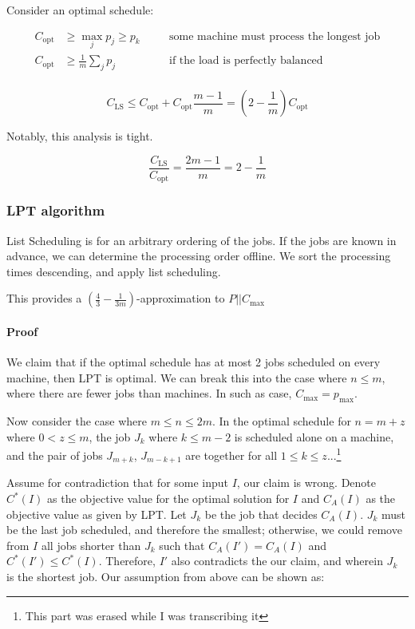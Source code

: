 \documentclass{idc_msc}
\begin{document}
Consider an optimal schedule:

\[
\begin{aligned}
  C_{\text{opt}} &\ge \max_j p_j \ge p_k &&\quad \text{some machine must process the longest job} \\
  C_{\text{opt}} &\ge \frac{1}{m} \sum_j p_j &&\quad \text{if the load is perfectly balanced} \\  
\end{aligned}
\]

\[
  C_{\text{LS}} \le C_{\text{opt}} + C_{\text{opt}} \frac{m-1}{m} = \left(2 - \frac{1}{m}\right) C_{\text{opt}}
\]

Notably, this analysis is tight.

\[
  \frac{C_{\text{LS}}}{C_{\text{opt}}} = \frac{2m-1}{m} = 2 - \frac{1}{m}
\]

\subsubsection{LPT algorithm}

List Scheduling is for an arbitrary ordering of the jobs.
If the jobs are known in advance, we can determine the processing order offline.
We sort the processing times descending, and apply list scheduling.

This provides a \(\left(\frac{4}{3} - \frac{1}{3m}\right)\)-approximation to \(P||C_{\max}\)

\paragraph{Proof}

We claim that if the optimal schedule has at most 2 jobs scheduled on every machine, then LPT is optimal.
We can break this into the case where \(n \le m\), where there are fewer jobs than machines.
In such as case, \(C_{\max} = p_{\max}\).

Now consider the case where \(m \le n \le 2m\).
In the optimal schedule for \(n = m+z\) where \(0 < z \le m\), the job \(J_k\) where \(k \le m - 2\) is scheduled alone on a machine, and the pair of jobs \(J_{m + k}\), \(J_{m - k + 1}\) are together for all \(1 \le k \le z\)...\footnote{This part was erased while I was transcribing it}

Assume for contradiction that for some input \(I\), our claim is wrong.
Denote \(C^*(I)\) as the objective value for the optimal solution for \(I\) and \(C_{A}(I)\) as the objective value as given by LPT.
Let \(J_k\) be the job that decides \(C_A(I)\).
\(J_k\) must be the last job scheduled, and therefore the smallest; otherwise, we could remove from \(I\) all jobs shorter than \(J_k\) such that \(C_A(I') = C_A(I)\) and \(C^*(I') \le C^*(I)\).
Therefore, \(I'\) also contradicts the our claim, and wherein \(J_k\) is the shortest job.
Our assumption from above can be shown as:
\end{document}
